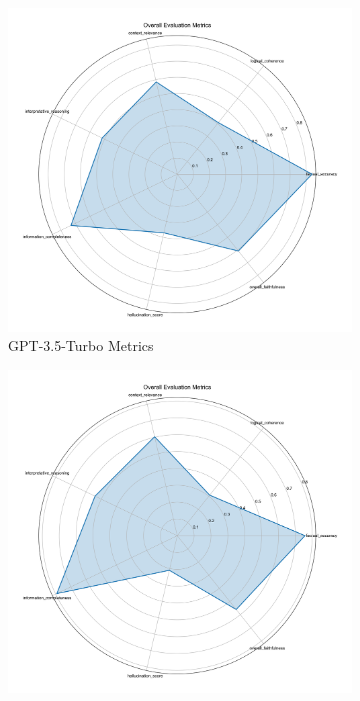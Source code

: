 \begin{figure}[!htbp]
\centering
\begin{subfigure}{0.3\textwidth}
    \includegraphics[width=\textwidth]{figures/overall/overall_metrics_radar_gpt-3.5-turbo.png}
    \caption{GPT-3.5-Turbo Metrics}
    \label{fig:overall_metrics_radar_gpt35}
\end{subfigure}
\begin{subfigure}{0.3\textwidth}
    \includegraphics[width=\textwidth]{figures/overall/overall_metrics_radar_gpt-4-turbo.png}

\end{subfigure}
\end{figure}
